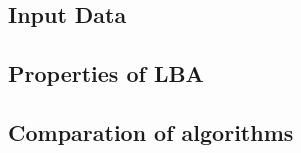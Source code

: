 \subsection{Input Data}


\subsection{Properties of \ac{LBA}}
%

\subsection{Comparation of algorithms}

